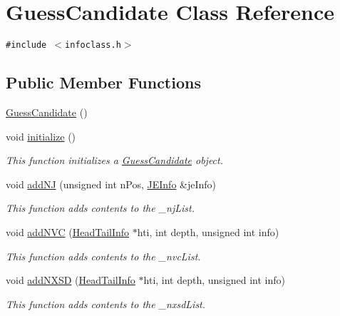 \hypertarget{classGuessCandidate}{
\section{GuessCandidate Class Reference}
\label{classGuessCandidate}
}
{\tt \#include $<$infoclass.h$>$}

\subsection*{Public Member Functions}
\begin{CompactItemize}
\item 
\hyperlink{classGuessCandidate_e70b08d1594bbee7a858bd3daa3e56cf}{GuessCandidate} ()
\item 
void \hyperlink{classGuessCandidate_a5b6783e92b61856af930a78f8b1c15e}{initialize} ()
\begin{CompactList}\small\item\em This function initializes a \hyperlink{classGuessCandidate}{GuessCandidate} object. \item\end{CompactList}\item 
void \hyperlink{classGuessCandidate_82efa1e3539398ef8c2d0e59540bbcb8}{addNJ} (unsigned int nPos, \hyperlink{classJEInfo}{JEInfo} \&jeInfo)
\begin{CompactList}\small\item\em This function adds contents to the \_\-njList. \item\end{CompactList}\item 
void \hyperlink{classGuessCandidate_c013dcabd5da13af7a93a8c037349b25}{addNVC} (\hyperlink{classHeadTailInfo}{HeadTailInfo} $\ast$hti, int depth, unsigned int info)
\begin{CompactList}\small\item\em This function adds contents to the \_\-nvcList. \item\end{CompactList}\item 
void \hyperlink{classGuessCandidate_e2eaac995e76c7f4477fd487eb0147b9}{addNXSD} (\hyperlink{classHeadTailInfo}{HeadTailInfo} $\ast$hti, int depth, unsigned int info)
\begin{CompactList}\small\item\em This function adds contents to the \_\-nxsdList. \item\end{CompactList}\item 

\end{CompactItemize}
